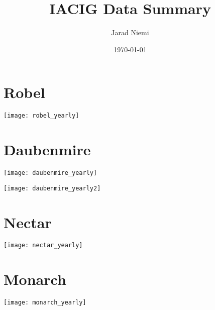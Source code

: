 \documentclass{article}
\title{IACIG Data Summary}
\author{Jarad Niemi}
\date{\today}
\begin{document}
\maketitle

\section{Robel}


\texttt{[image: robel\_yearly]}

\newpage
\section{Daubenmire}

\texttt{[image: daubenmire\_yearly]}

\texttt{[image: daubenmire\_yearly2]}

\clearpage
\section{Nectar}

\texttt{[image: nectar\_yearly]}



\clearpage
\section{Monarch}

\texttt{[image: monarch\_yearly]}
\end{document}
